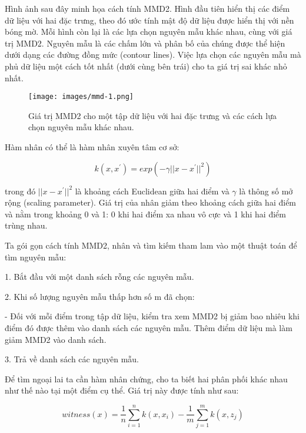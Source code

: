 Hình ảnh sau đây minh họa cách tính MMD2. Hình đầu tiên hiển thị các điểm dữ liệu với hai đặc trưng, theo đó ước tính mật độ dữ liệu được hiển thị với nền bóng mờ. Mỗi hình còn lại là các lựa chọn nguyên mẫu khác nhau, cùng với giá trị MMD2. Nguyên mẫu là các chấm lớn và phân bố của chúng được thể hiện dưới dạng các đường đồng mức (contour lines). Việc lựa chọn các nguyên mẫu mà phủ dữ liệu một cách tốt nhất (dưới cùng bên trái) cho ta giá trị sai khác nhỏ nhất.

\begin{figure*}[h!]
	\centering
	\texttt{[image: images/mmd-1.png]}
    \caption{Giá trị MMD2 cho một tập dữ liệu với hai đặc trưng và các cách lựa chọn nguyên mẫu khác nhau.}
\end{figure*}

Hàm nhân có thể là hàm nhân xuyên tâm cơ sở:

$$k(x,x^\prime)=exp\left(-\gamma||x-x^\prime||^2\right)$$

trong đó $||x-x^\prime||^2$ là khoảng cách Euclidean giữa hai điểm và $\gamma$ là thông số mở rộng (scaling parameter). Giá trị của nhân giảm theo khoảng cách giữa hai điểm và nằm trong khoảng 0 và 1: 0 khi hai điểm xa nhau vô cực và 1 khi hai điểm trùng nhau.

Ta gói gọn cách tính MMD2, nhân và tìm kiếm tham lam vào một thuật toán để tìm nguyên mẫu:

1. Bắt đầu với một danh sách rỗng các nguyên mẫu.

2. Khi số lượng nguyên mẫu thấp hơn số m đã chọn:

- Đối với mỗi điểm trong tập dữ liệu, kiểm tra xem MMD2 bị giảm bao nhiêu khi điểm đó được thêm vào danh sách các nguyên mẫu. Thêm điểm dữ liệu mà làm giảm MMD2 vào danh sách.

3. Trả về danh sách các nguyên mẫu.

Để tìm ngoại lai ta cần hàm nhân chứng, cho ta biết hai phân phối khác nhau như thế nào tại một điểm cụ thể. Giá trị này được tính như sau:

$$witness(x)=\frac{1}{n}\sum_{i=1}^nk(x,x_i)-\frac{1}{m}\sum_{j=1}^mk(x,z_j)$$


